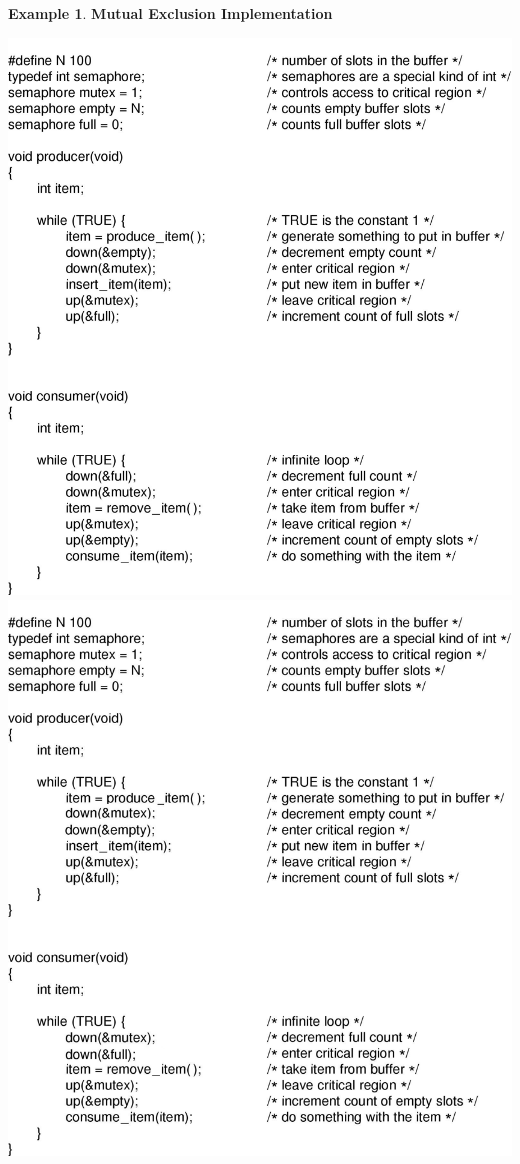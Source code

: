 \documentclass[12pt,a4paper]{article}
\theoremstyle{definition}
\newtheorem{example}{Example}[section]
\newenvironment{myitemize}
{ \begin{itemize}
    \setlength{\itemsep}{5pt}
    \setlength{\parskip}{0pt}
    \setlength{\parsep}{0pt}     }
{ \end{itemize}                  }
\begin{document}
\begin{example}{\textbf{Mutual Exclusion Implementation}}
\begin{myitemize}
\begin{myitemize}
\begin{tcolorbox}
				\includegraphics[scale=0.52]{m1/producerConsumerCode1}
				\includegraphics[scale=0.52]{m1/producerConsumerCode2}

\end{tcolorbox}
\end{myitemize}
\end{myitemize}
\end{example}
\end{document}
